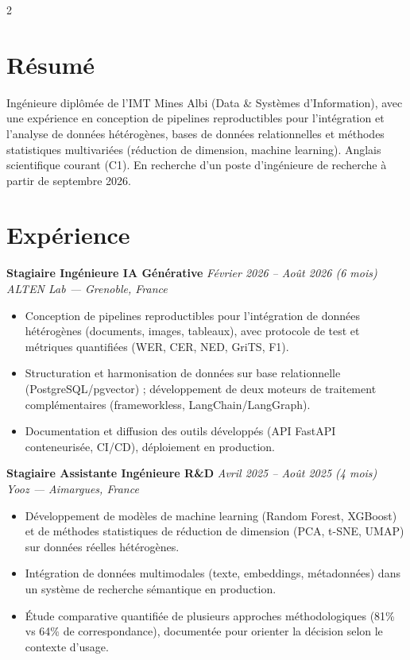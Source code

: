 \documentclass[10.5pt,a4paper]{article}
\newcommand{\sectionrule}{\vspace{-6pt}{\color{accent}\hrule height 1pt}\vspace{4pt}}
\newcommand{\cvexp}[5]{%
  \noindent\textbf{#1} \hfill {\itshape\color{graytext}\small #4}\\
  {\itshape #2 --- #3}\\[-2pt]
  #5
  \vspace{6pt}
}
\begin{document}
\setlength{\columnsep}{1.5em}
\begin{paracol}{2}

\section*{Résumé}
\sectionrule
\justifying
Ingénieure diplômée de l'IMT Mines Albi (Data \& Systèmes d'Information), avec une expérience en conception de pipelines reproductibles pour l'intégration et l'analyse de données hétérogènes, bases de données relationnelles et méthodes statistiques multivariées (réduction de dimension, machine learning). Anglais scientifique courant (C1). En recherche d'un poste d'ingénieure de recherche à partir de septembre 2026.

\section*{Expérience}
\sectionrule

\cvexp{Stagiaire Ingénieure IA Générative}{ALTEN Lab}{Grenoble, France}{Février 2026 -- Août 2026 (6 mois)}{%
  \begin{itemize}[leftmargin=12pt, itemsep=2pt, topsep=0pt, partopsep=0pt, parsep=0pt]
    \item Conception de pipelines reproductibles pour l'intégration de données hétérogènes (documents, images, tableaux), avec protocole de test et métriques quantifiées (WER, CER, NED, GriTS, F1).
    \item Structuration et harmonisation de données sur base relationnelle (PostgreSQL/\allowbreak pgvector) ; développement de deux moteurs de traitement complémentaires (frameworkless, LangChain/\allowbreak LangGraph).
    \item Documentation et diffusion des outils développés (API FastAPI conteneurisée, CI/CD), déploiement en production.
  \end{itemize}
}

\cvexp{Stagiaire Assistante Ingénieure R\&D}{Yooz}{Aimargues, France}{Avril 2025 -- Août 2025 (4 mois)}{%
  \begin{itemize}[leftmargin=12pt, itemsep=2pt, topsep=0pt, partopsep=0pt, parsep=0pt]
    \item Développement de modèles de machine learning (Random Forest, XGBoost) et de méthodes statistiques de réduction de dimension (PCA, t-SNE, UMAP) sur données réelles hétérogènes.
    \item Intégration de données multimodales (texte, embeddings, métadonnées) dans un système de recherche sémantique en production.
    \item Étude comparative quantifiée de plusieurs approches méthodologiques (81\% vs 64\% de correspondance), documentée pour orienter la décision selon le contexte d'usage.
  \end{itemize}
}


\end{paracol}
\end{document}

